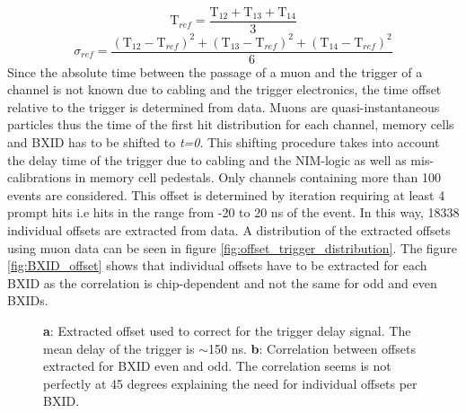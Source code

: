\documentclass[twoside,a4paper,11pt]{article}
\begin{document}
\begin{equation} \label{eq:tref}
\text{T}_{ref} = \frac{\text{T}_{12} + \text{T}_{13} + \text{T}_{14}}{3}
\end{equation}
\begin{equation} \label{eq:tref_err}
\sigma_{ref} = \frac{ (\text{T}_{12} - \text{T}_{ref})^2 + (\text{T}_{13} - \text{T}_{ref})^2  + (\text{T}_{14} - \text{T}_{ref})^2 }{6}
\end{equation}
Since the absolute time between the passage of a muon and the trigger of a channel is not known due to cabling and the trigger electronics, the time offset relative to the trigger is determined from data. Muons are quasi-instantaneous particles thus the time of the first hit distribution for each channel, memory cells and BXID has to be shifted to \textit{t=0}. This shifting procedure takes into account the delay time of the trigger due to cabling and the NIM-logic as well as mis-calibrations in memory cell pedestals. Only channels containing more than 100 events are considered. This offset is determined by iteration requiring at least 4 prompt hits i.e hits in the range from -20 to 20 ns of the event. In this way, 18338 individual offsets are extracted from data. A distribution of the extracted offsets using muon data can be seen in figure \ref{fig:offset_trigger_distribution}. The figure \ref{fig:BXID_offset} shows that individual offsets have to be extracted for each BXID as the correlation is chip-dependent and not the same for odd and even BXIDs.
\begin{figure}[htbp]
	\hfill
	\hfill
	\caption[]{\textbf{a}: Extracted offset used to correct for the trigger delay signal. The mean delay of the trigger is $\sim$150 ns. \textbf{b}: Correlation between offsets extracted for BXID even and odd. The correlation seems is not perfectly at 45 degrees explaining the need for individual offsets per BXID.}
\end{figure}
\end{document}
